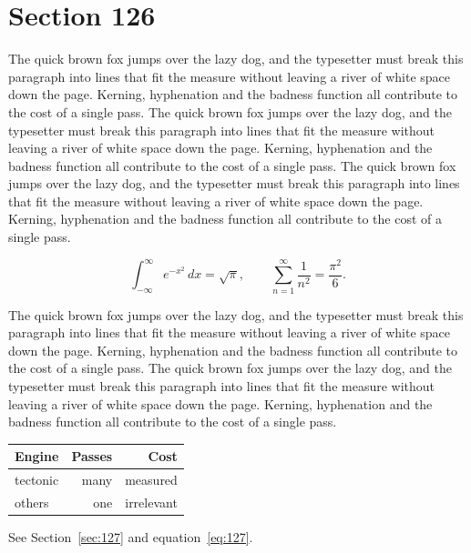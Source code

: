 \documentclass{article}
\begin{document}
\section{Section 126}
\label{sec:126}
The quick brown fox jumps over the lazy dog, and the typesetter must break this paragraph into lines that fit the measure without leaving a river of white space down the page. Kerning, hyphenation and the badness function all contribute to the cost of a single pass. The quick brown fox jumps over the lazy dog, and the typesetter must break this paragraph into lines that fit the measure without leaving a river of white space down the page. Kerning, hyphenation and the badness function all contribute to the cost of a single pass. The quick brown fox jumps over the lazy dog, and the typesetter must break this paragraph into lines that fit the measure without leaving a river of white space down the page. Kerning, hyphenation and the badness function all contribute to the cost of a single pass. 

\begin{equation}\label{eq:126}
\int_{-\infty}^{\infty} e^{-x^{2}}\,dx = \sqrt{\pi}, \qquad
\sum_{n=1}^{\infty} \frac{1}{n^{2}} = \frac{\pi^{2}}{6}.
\end{equation}

The quick brown fox jumps over the lazy dog, and the typesetter must break this paragraph into lines that fit the measure without leaving a river of white space down the page. Kerning, hyphenation and the badness function all contribute to the cost of a single pass. The quick brown fox jumps over the lazy dog, and the typesetter must break this paragraph into lines that fit the measure without leaving a river of white space down the page. Kerning, hyphenation and the badness function all contribute to the cost of a single pass. 

\begin{center}
\begin{tabular}{lrr}
\toprule
Engine & Passes & Cost \\
\midrule
tectonic & many & measured \\
others & one & irrelevant \\
\bottomrule
\end{tabular}
\end{center}

See Section~\ref{sec:127} and equation~\eqref{eq:127}.
\end{document}
